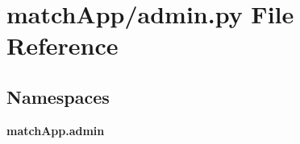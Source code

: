 \section{match\+App/admin.py File Reference}
\label{admin_8py}
\subsection*{Namespaces}
\begin{DoxyCompactItemize}
\item 
 {\bf match\+App.\+admin}
\end{DoxyCompactItemize}
